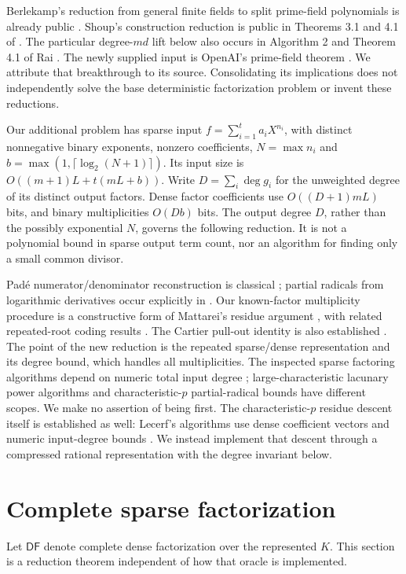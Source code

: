 \documentclass[11pt]{article}
\begin{document}
Berlekamp's reduction from general finite fields to split prime-field
polynomials is already public \cite{Berlekamp70}. Shoup's construction
reduction is public in Theorems 3.1 and 4.1 of \cite{Shoup90}.
The particular degree-$md$ lift below also occurs in Algorithm 2 and
Theorem 4.1 of Rai \cite{Rai24}. The newly supplied input is OpenAI's
prime-field theorem \cite{OAI142}. We attribute that breakthrough to its
source. Consolidating its implications does not independently solve the
base deterministic factorization problem or invent these reductions.

Our additional problem has sparse input $f=\sum_{i=1}^t a_iX^{n_i}$,
with distinct nonnegative binary exponents, nonzero coefficients,
$N=\max n_i$ and $b=\max(1,\lceil\log_2(N+1)\rceil)$. Its input
size is $O((m+1)L+t(mL+b))$. Write $D=\sum_i\deg g_i$ for the
unweighted degree of its distinct output factors. Dense factor coefficients
use $O((D+1)mL)$ bits, and binary multiplicities $O(Db)$ bits.
The output degree $D$, rather than the possibly exponential $N$, governs
the following reduction. It is not a polynomial bound in sparse output
term count, nor an algorithm for finding only a small common divisor.

Pad\'e numerator/denominator reconstruction is classical
\cite[Section 8]{Kaltofen88}; partial radicals from logarithmic derivatives
occur explicitly in \cite[Section 6.3]{DSS22}. Our known-factor multiplicity
procedure is a constructive form of Mattarei's residue argument
\cite[Theorem 2]{Mattarei07}, with related repeated-root coding results
\cite{MCJ73}. The Cartier pull-out identity is also established
\cite[Proposition 1.9]{RY15}. The point of the new reduction is the repeated
sparse/dense representation and its degree bound, which handles all
multiplicities. The inspected sparse factoring algorithms depend on numeric
total input degree \cite{DvH25}; large-characteristic lacunary power
algorithms \cite{GR11} and characteristic-$p$ partial-radical bounds
\cite{DSS22} have different scopes. We make no assertion of being first.
The characteristic-$p$ residue descent itself is established as well:
Lecerf's algorithms use dense coefficient vectors and numeric input-degree
bounds \cite[Sections 2.1--2.2]{Lecerf08}. We instead implement that descent
through a compressed rational representation with the degree invariant below.

\section{Complete sparse factorization}
Let $\mathsf{DF}$ denote complete dense factorization over the represented
$K$. This section is a reduction theorem independent of how that oracle is
implemented.
\end{document}
